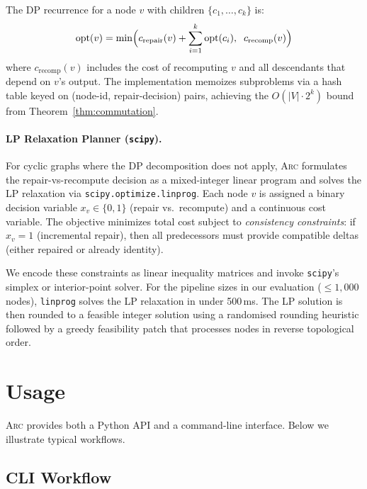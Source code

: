 \documentclass[sigplan,screen,nonacm]{acmart}
\newcommand{\arc}{\textsc{Arc}\xspace}
\begin{document}
The DP recurrence for a node $v$ with children $\{c_1, \ldots, c_k\}$
is:
\[
  \mathrm{opt}(v) = \min\Bigl(
    c_{\mathrm{repair}}(v) + \sum_{i=1}^{k} \mathrm{opt}(c_i),\;\;
    c_{\mathrm{recomp}}(v)
  \Bigr)
\]
where $c_{\mathrm{recomp}}(v)$ includes the cost of recomputing $v$
and all descendants that depend on $v$'s output.  The implementation
memoizes subproblems via a hash table keyed on (node-id,
repair-decision) pairs, achieving the $O(|V| \cdot 2^k)$ bound from
Theorem~\ref{thm:commutation}.

\paragraph{LP Relaxation Planner (\texttt{scipy}).}
For cyclic graphs where the DP decomposition does not apply, \arc
formulates the repair-vs-recompute decision as a mixed-integer
linear program and solves the LP relaxation via
\texttt{scipy.optimize.linprog}.  Each node
$v$ is assigned a binary decision variable $x_v \in \{0,1\}$ (repair
vs.\ recompute) and a continuous cost variable.  The objective
minimizes total cost subject to \emph{consistency constraints}:
if $x_v = 1$ (incremental repair), then all predecessors must provide
compatible deltas (either repaired or already identity).

We encode these constraints as linear inequality matrices and
invoke \texttt{scipy}'s simplex or interior-point solver.
For the pipeline sizes in our evaluation ($\leq 1{,}000$ nodes),
\texttt{linprog} solves the LP relaxation in under 500\,ms.  The LP
solution is then rounded to a feasible integer solution using a
randomised rounding heuristic followed by a greedy feasibility patch
that processes nodes in reverse topological order.

\section{Usage}\label{sec:usage}

\arc provides both a Python API and a command-line interface.  Below we
illustrate typical workflows.

\subsection{CLI Workflow}
\end{document}
